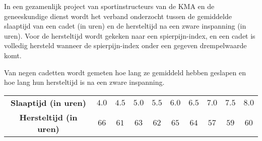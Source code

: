 \begin{question}{30}{
    In een gezamenlijk project van sportinstructeurs van de KMA en de geneeskundige dienst wordt het verband onderzocht tussen de gemiddelde slaaptijd van een cadet (in uren) en de hersteltijd na een zware inspanning (in uren).
    Voor de hersteltijd wordt gekeken naar een spierpijn-index, en een cadet is volledig hersteld wanneer de spierpijn-index onder een gegeven drempelwaarde komt.

    Van negen cadetten wordt gemeten hoe lang ze gemiddeld hebben geslapen en hoe lang hun hersteltijd is na een zware inspanning.
    \begin{center}
        \begin{tabular}{c|ccccccccc}
            \toprule
                \textbf{Slaaptijd (in uren)} & $4.0$ & $4.5$ & $5.0$ & $5.5$ & $6.0$ & $6.5$ & $7.0$ & $7.5$ & $8.0$ \\
                \textbf{Hersteltijd (in uren)} & $66$ & $61$ & $63$ & $62$ & $65$ & $64$ & $57$ & $59$ & $60$ \\
            \bottomrule
        \end{tabular}
    \end{center}
}
    


\end{question}
